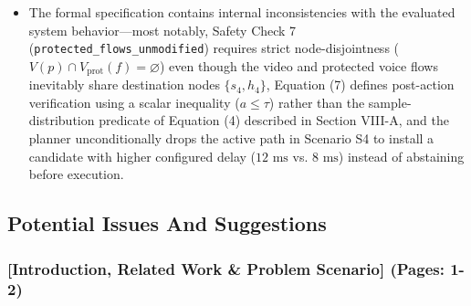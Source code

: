 \documentclass[11pt,a4paper]{article}
\begin{document}
\begin{itemize}[leftmargin=1.8em,itemsep=2pt]
\item The formal specification contains internal inconsistencies with the evaluated system behavior—most notably, Safety Check 7 (\texttt{protected\_flows\_unmodified}) requires strict node-disjointness ($V(p) \cap V_{\text{prot}}(f) = \varnothing$) even though the video and protected voice flows inevitably share destination nodes $\{s_4, h_4\}$, Equation (7) defines post-action verification using a scalar inequality ($a \le \tau$) rather than the sample-distribution predicate of Equation (4) described in Section VIII-A, and the planner unconditionally drops the active path in Scenario S4 to install a candidate with higher configured delay ($12\text{ ms}$ vs. $8\text{ ms}$) instead of abstaining before execution.
\end{itemize}
\subsection*{Potential Issues And Suggestions}
\subsubsection*{[Introduction, Related Work \& Problem Scenario] (Pages: 1-2)}
\end{document}
